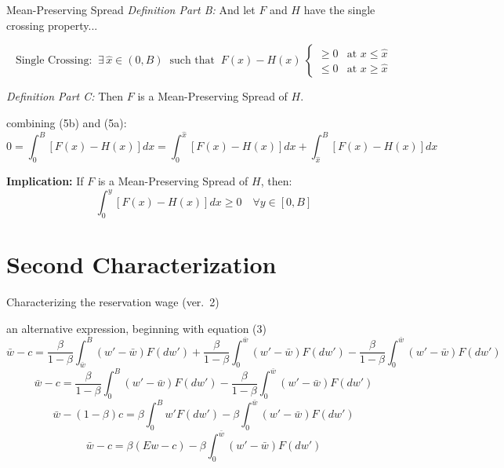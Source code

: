 \documentclass[aspectratio=169,xcolor=dvipsnames]{beamer}
\let\tempone\itemize
\let\temptwo\enditemize
\renewenvironment{itemize}{\tempone\addtolength{\itemsep}{\fill}}{\temptwo}
\begin{document}
\begin{frame}{Mean-Preserving Spread}
\label{slide:McCall_10}
\small
\emph{Definition Part B:} And let $F$ and $H$ have the single crossing property...

\vspace{0.4em}
\[
\text{Single Crossing: }\ \exists\,\hat x\in(0,B)\ \text{ such that }\
F(x)-H(x)\ \begin{cases}
\ge 0 & \text{at } x\le \hat x\\
\le 0 & \text{at } x\ge \hat x
\end{cases}
\tag{5b}
\]

\vspace{0.2em}
\emph{Definition Part C:} Then $F$ is a Mean-Preserving Spread of $H$.

\begin{itemize}
    \item combining (5b) and (5a):
    \[
        0=\int_0^B [F(x)-H(x)]dx
        =\int_0^{\hat x}[F(x)-H(x)]dx+\int_{\hat x}^{B}[F(x)-H(x)]dx
    \]
\end{itemize}

\textbf{Implication:} If $F$ is a Mean-Preserving Spread of $H$, then:
\[
\int_0^{y}[F(x)-H(x)]dx\ge 0
\quad \forall y\in[0,B]
\tag{5c}
\]
\end{frame}

\section{Second Characterization}
\label{sec:Second_Characterization}


\begin{frame}{Characterizing the reservation wage (ver.\ 2)}
\label{slide:McCall_11}
\small
\begin{itemize}
    \item an alternative expression, beginning with equation (3)
\end{itemize}
\[
\bar w-c=\frac{\beta}{1-\beta}\int_{\bar w}^{B}(w'-\bar w)F(dw')
+\frac{\beta}{1-\beta}\int_0^{\bar w}(w'-\bar w)F(dw')
-\frac{\beta}{1-\beta}\int_0^{\bar w}(w'-\bar w)F(dw')
\]
\[
\bar w-c=\frac{\beta}{1-\beta}\int_{0}^{B}(w'-\bar w)F(dw')
-\frac{\beta}{1-\beta}\int_0^{\bar w}(w'-\bar w)F(dw')
\]
\[
\bar w-(1-\beta)c
=\beta\int_0^{B} w'F(dw')-\beta\int_0^{\bar w}(w'-\bar w)F(dw')
\]
\[
\bar w-c=\beta(Ew-c)-\beta\int_0^{\bar w}(w'-\bar w)F(dw') \tag{**}
\]
\end{frame}
\end{document}
